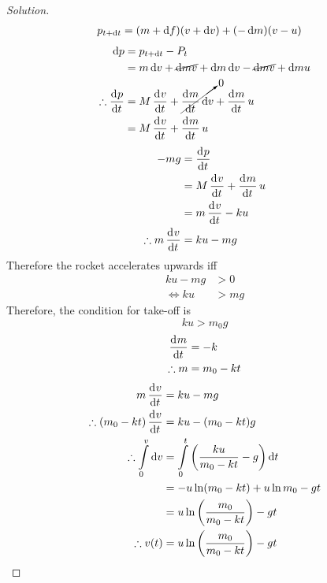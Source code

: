 \documentclass[fleqn, a4paper, 12pt]{article}
\theoremstyle{definition}
\theoremstyle{theorem}
\newenvironment{solution}
{\begin{proof}[Solution]\let\qed\relax}
	{\end{proof}}
\begin{document}
\begin{solution}
	\begin{align*}
	p_{t + \dif t} &= (m + \dif f) (v + \dif v) + (- \dif m) (v - u)
	\end{align*}
	\begin{align*}
		\dif p &= p_{t + \dif t} - P_t\\
		&= m \dif v + \cancel{\dif m v} +\dif m \dif v - \cancel{\dif m v} + \dif m u\\
		\therefore \dod{p}{t} &= M \dod{v}{t} + \cancelto{0}{\dod{m}{t} \dif v} + \dod{m}{t} u\\
		&= M \dod{v}{t} + \dod{m}{t} u
	\end{align*}
	\begin{align*}
		- m g &= \dod{p}{t}\\
		&= M \dod{v}{t} + \dod{m}{t} u\\
		&= m \dod{v}{t} - k u\\
		\therefore m \dod{v}{t} &= k u - m g
	\end{align*}
	Therefore the rocket accelerates upwards iff
	\begin{align*}
		k u - m g &> 0\\
		\iff k u &> m g
	\end{align*}
	Therefore, the condition for take-off is
	\begin{equation*}
		k u > m_0 g
	\end{equation*}
	\begin{align*}
		\dod{m}{t} &= -k\\
		\therefore m&= m_0 - k t
	\end{align*}
	\begin{align*}
		m \dod{v}{t} &= k u - m g\\
		\therefore (m_0 - k t) \dod{v}{t} &= k u - (m_0 - k t)g\\
		\therefore \int\limits_{0}^{v} \dif v &= \int\limits_{0}^{t} \left( \dfrac{k u}{m_0 - k t} - g \right) \dif t\\
		&= - u \ln (m_0 - k t) + u \ln m_0 - g t\\
		&= u \ln \left(\dfrac{m_0}{m_0 - k t}\right) - g t\\
		\therefore v(t) &= u \ln \left(\dfrac{m_0}{m_0 - k t}\right) - g t
	\end{align*}
\end{solution}
\end{document}
